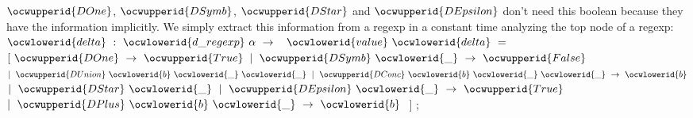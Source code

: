 \documentclass[12pt]{article}
\begin{document}
\ocwendcode{}\ocwindent{0.00em}
\ocwbegindcode{}$\ocwupperid{DOne}$\ocwenddcode{}, \ocwbegindcode{}$\ocwupperid{DSymb}$\ocwenddcode{}, \ocwbegindcode{}$\ocwupperid{DStar}$\ocwenddcode{} and \ocwbegindcode{}$\ocwupperid{DEpsilon}$\ocwenddcode{} don't need this boolean because 
   they have the information implicitly. 
\ocweol
\ocwindent{0.00em}
We simply extract this information from a regexp in a constant 
   time analyzing the top node of a regexp: 
\ocweol
\ocwindent{0.00em}
\ocwbegindcode{}$\ocwlowerid{delta}~:~\ocwlowerid{d\_regexp}~\alpha{}~\rightarrow{}~$\ocwenddcode{} 
\ocweol
\label{../ML/regular.ml:7523}%
\medskip
\ocwbegincode{}\ocwindent{0.00em}
$\ocwlowerid{value}~\ocwlowerid{delta}~=~$~\ocweol
\ocwindent{1.00em}
$[~\ocwupperid{DOne}~\rightarrow{}~\ocwupperid{True}$\ocweol
\ocwindent{1.00em}
$\mid{}~\ocwupperid{DSymb}~\ocwlowerid{\_}~\rightarrow{}~\ocwupperid{False}$\ocweol
\ocwindent{1.00em}
$\mid{}~\ocwupperid{DUnion}~\ocwlowerid{b}~\ocwlowerid{\_}~\ocwlowerid{\_}~\mid{}~\ocwupperid{DConc}~\ocwlowerid{b}~\ocwlowerid{\_}~\ocwlowerid{\_}~\rightarrow{}~\ocwlowerid{b}$\ocweol
\ocwindent{1.00em}
$\mid{}~\ocwupperid{DStar}~\ocwlowerid{\_}~\mid{}~\ocwupperid{DEpsilon}~\ocwlowerid{\_}~\rightarrow{}~\ocwupperid{True}$\ocweol
\ocwindent{1.00em}
$\mid{}~\ocwupperid{DPlus}~\ocwlowerid{b}~\ocwlowerid{\_}~\rightarrow{}~\ocwlowerid{b}~$\ocweol
\ocwindent{1.00em}
$]$\ocweol
\ocwindent{0.00em}
;\medskip
\end{document}
